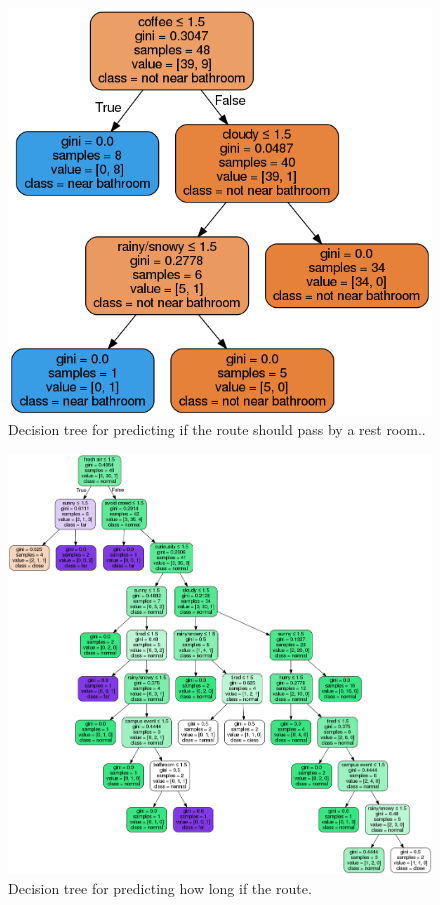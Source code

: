 \documentclass{sigchi}
\begin{document}
\begin{figure}[!h]
\centering
\includegraphics[width=0.7\columnwidth]{pics/decisionTree_6.png}
\caption{Decision tree for predicting if the route should pass by a rest room..}
\label{fig:dt6}
\end{figure}

\begin{figure}[!h]
\centering
\includegraphics[width=2.0\columnwidth]{pics/decisionTree_7.png}
\caption{Decision tree for predicting how long if the route.}
\label{fig:dt7}
\end{figure}
\end{document}
